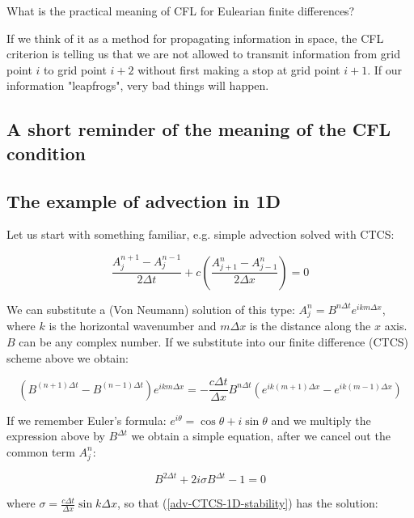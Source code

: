 What is the practical meaning of CFL for Eulearian finite differences?

If we think of it as a method for propagating information in space, the CFL criterion is telling us that we are not allowed to transmit information from grid point $i$ to grid point $i+2$ without first making a stop at grid point $i+1$.
If our information "leapfrogs", very bad things will happen.
	
\subsection{A short reminder of the meaning of the CFL condition}
\subsection{The example of advection in 1D}

	Let us start with something familiar, e.g. simple advection solved with CTCS:
	
	\begin{equation}
		\frac {A_j^{n+1}-A_j^{n-1}}{ 2 \Delta t} +c \left(  \frac {A_{j+1}^{n}-A_{j-1}^{n}}{ 2 \Delta x}  \right) = 0
		\label{adv-CTCS-1D}
	\end{equation}
	
	We can substitute a (Von Neumann) solution of this type: ${A_j^{n}=B^{n \Delta t} e^{i k m \Delta x}}$, where $k$ is the horizontal wavenumber and $m \Delta x$ is the distance along the $x$ axis. $B$ can be any complex number. If we substitute into our finite difference (CTCS) scheme above we obtain:
	
	\begin{equation}
		\left ( B^{(n+1)\Delta t}-B^{(n-1) \Delta t} \right ) e^{i k m \Delta x} = - \frac {c \Delta t}{\Delta x} B^{n \Delta t} \left( e^{i k (m+1) \Delta x}  - e^{i k (m-1) \Delta x}  \right)
		\label{adv-CTCS-1D-solution}
	\end{equation}
	
	If we remember Euler's formula: $e^{i \theta}=\cos \theta +i \sin \theta$ and we multiply the expression above by $B^{\Delta t}$ we obtain a simple equation, after we cancel out the common term $A_j^{n}$:
	
	\begin{equation}
		B^{2 \Delta t}    + 2 i \sigma B^{\Delta t}  -1 = 0  
		\label{adv-CTCS-1D-stability}
	\end{equation}
	
	where $\sigma = \frac {c \Delta t}{\Delta x} \sin k \Delta x$, so that (\ref{adv-CTCS-1D-stability}) has the solution:
	
